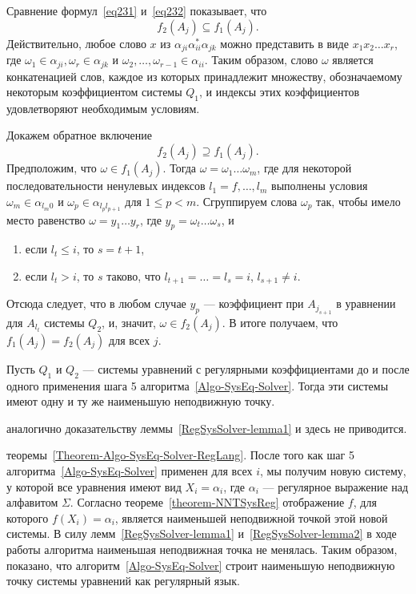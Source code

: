 \begin{myproof}
Сравнение формул~\eqref{eq231} и~\eqref{eq232} показывает, что
\[
	f_2(A_j)\subseteq f_1(A_j).
\]
Действительно, любое слово $x$ из $\alpha_{ji}\alpha^*_{ii}\alpha_{jk}$ можно представить в виде $x_1x_2\ldots x_r$, где $\omega_1\in\alpha_{ji}, \omega_r\in\alpha_{jk}$ и $\omega_2,\ldots ,\omega_{r-1}\in\alpha_{ii}$. Таким образом, слово $\omega$ является конкатенацией слов, каждое из которых принадлежит множеству, обозначаемому некоторым коэффициентом системы $Q_1$, и индексы этих коэффициентов удовлетворяют необходимым условиям.

	Докажем обратное включение
\[
	f_2(A_j)\supseteq f_1(A_j).
\]
Предположим, что $\omega\in f_1(A_j)$. Тогда $\omega=\omega_1\ldots\omega_m$, где для некоторой последовательности ненулевых индексов $l_1=f,\ldots ,l_m$ выполнены условия $\omega_m\in\alpha_{l_m0}$ и $\omega_p\in\alpha_{l_{p}l_{p+1}}$ для $1\le p<m$. Сгруппируем слова $\omega_p$ так, чтобы имело место равенство $\omega=y_1\ldots y_r$, где $y_p=\omega_t\ldots\omega_s$, и
\begin{enumerate}
	\item если $l_t\le i$, то $s=t+1$,
	\item если $l_t>i$, то $s$ таково, что $l_{t+1}=\ldots =l_s=i$, $l_{s+1}\neq i$.
\end{enumerate}
Отсюда следует, что в любом случае $y_p$ --- коэффициент при $A_{j_{s+1}}$ в уравнении для $A_{l_t}$ системы $Q_2$, и, значит, $\omega\in f_2(A_j)$. В итоге получаем, что $f_1(A_j)=f_2(A_j)$ для всех $j$.
\end{myproof}

\begin{mylemma}\label{RegSysSolver-lemma2}
Пусть $Q_1$ и $Q_2$ --- системы уравнений с регулярными коэффициентами до и после одного применения шага 5 алгоритма~\ref{Algo-SysEq-Solver}. Тогда эти системы имеют одну и ту же наименьшую неподвижную точку.
\end{mylemma}

\begin{myproof}
аналогично доказательству леммы~\ref{RegSysSolver-lemma1} и здесь не приводится.
\end{myproof}

\begin{myproof}
теоремы~\ref{Theorem-Algo-SysEq-Solver-RegLang}. После того как шаг 5 алгоритма~\ref{Algo-SysEq-Solver} применен для всех $i$, мы получим новую систему, у которой все уравнения имеют вид $X_i=\alpha_i$, где $\alpha_i$ --- регулярное выражение над алфавитом $\Sigma$. Согласно теореме~\ref{theorem-NNTSysReg} отображение $f$, для которого $f(X_{i})=\alpha_{i}$, является наименьшей неподвижной точкой этой новой системы. В силу лемм~\ref{RegSysSolver-lemma1} и~\ref{RegSysSolver-lemma2} в ходе работы алгоритма наименьшая неподвижная точка не менялась. Таким образом, показано, что алгоритм~\ref{Algo-SysEq-Solver} строит наименьшую неподвижную точку системы уравнений как регулярный язык.
\end{myproof}

